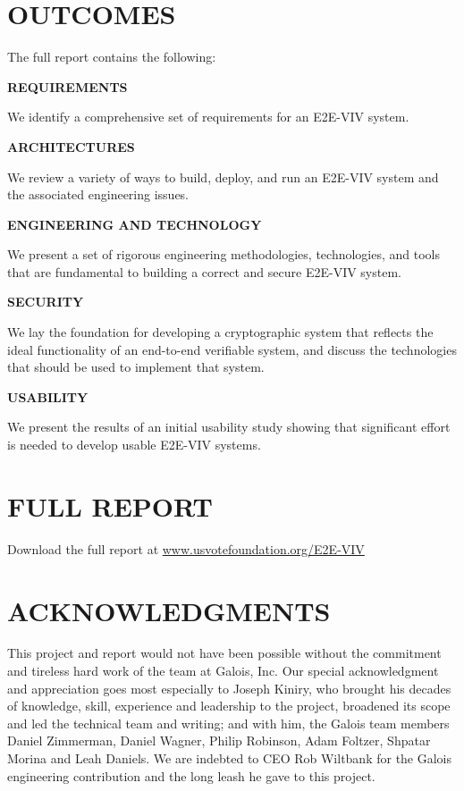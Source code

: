 \section*{OUTCOMES}

The full report contains the following:

\noindent \textbf{REQUIREMENTS}

We identify a comprehensive set of requirements for an E2E-VIV system.

\noindent \textbf{ARCHITECTURES}

We review a variety of ways to build, deploy, and run an E2E-VIV
system and the associated engineering issues.

\noindent \textbf{ENGINEERING AND TECHNOLOGY}

We present a set of rigorous engineering methodologies, technologies,
and tools that are fundamental to building a correct and secure
E2E-VIV system.

\noindent \textbf{SECURITY}

We lay the foundation for developing a cryptographic system that
reflects the ideal functionality of an end-to-end verifiable system,
and discuss the technologies that should be used to implement that
system.

\noindent \textbf{USABILITY}

We present the results of an initial usability study showing that
significant effort is needed to develop usable E2E-VIV systems.

\vspace{1cm}

\section*{FULL REPORT}

Download the full report at \url{www.usvotefoundation.org/E2E-VIV}
\newpage

\section*{ACKNOWLEDGMENTS}

This project and report would not have been possible without the
commitment and tireless hard work of the team at Galois, Inc. Our
special acknowledgment and appreciation goes most especially to Joseph
Kiniry, who brought his decades of knowledge, skill, experience and
leadership to the project, broadened its scope and led the technical
team and writing; and with him, the Galois team members Daniel
Zimmerman, Daniel Wagner, Philip Robinson, Adam Foltzer, Shpatar
Morina and Leah Daniels. We are indebted to CEO Rob Wiltbank for the
Galois engineering contribution and the long leash he gave to this
project.

